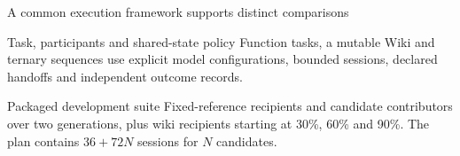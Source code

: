 \begin{frame}{A common execution framework supports distinct comparisons}
  \begin{block}{Task, participants and shared-state policy}
    Function tasks, a mutable Wiki and ternary sequences use explicit model configurations,
    bounded sessions, declared handoffs and independent outcome records.
  \end{block}
  \begin{block}{Packaged development suite}
    Fixed-reference recipients and candidate contributors over two generations,
    plus wiki recipients starting at 30\%, 60\% and 90\%.
    The plan contains $36+72N$ sessions for $N$ candidates.
  \end{block}
\end{frame}
